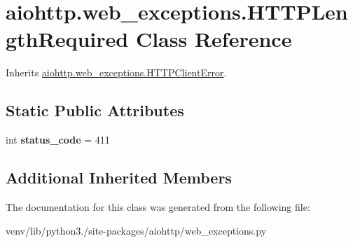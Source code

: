 \hypertarget{classaiohttp_1_1web__exceptions_1_1_h_t_t_p_length_required}{}\section{aiohttp.\+web\+\_\+exceptions.\+H\+T\+T\+P\+Length\+Required Class Reference}
\label{classaiohttp_1_1web__exceptions_1_1_h_t_t_p_length_required}


Inherits \hyperlink{classaiohttp_1_1web__exceptions_1_1_h_t_t_p_client_error}{aiohttp.\+web\+\_\+exceptions.\+H\+T\+T\+P\+Client\+Error}.

\subsection*{Static Public Attributes}
\begin{DoxyCompactItemize}
\item 
\mbox{\label{classaiohttp_1_1web__exceptions_1_1_h_t_t_p_length_required_a75cddec6d49a9162f6ee2b4b29f77b6f}} 
int {\bfseries status\+\_\+code} = 411
\end{DoxyCompactItemize}
\subsection*{Additional Inherited Members}


The documentation for this class was generated from the following file\+:\begin{DoxyCompactItemize}
\item 
venv/lib/python3./site-\/packages/aiohttp/web\+\_\+exceptions.\+py\end{DoxyCompactItemize}
